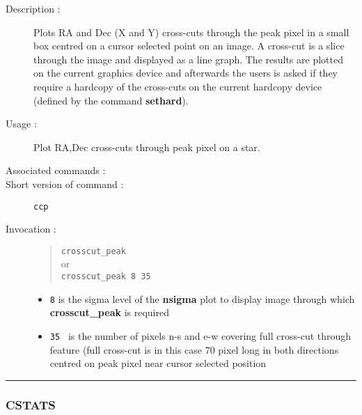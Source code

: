 \begin{description}

\item[Description :] Plots RA and Dec (X and Y) cross-cuts through the
peak pixel in a small box centred on a cursor selected point on an
image.  A cross-cut is a slice through the image and displayed as a
line graph.  The results are plotted on the current graphics device and
afterwards the users is asked if they require a hardcopy of the
cross-cuts on the current hardcopy device (defined by the command {\bf
sethard}).

\item[Usage :] Plot RA,Dec cross-cuts through peak pixel on a star.
\item[Associated commands :] {\tt {}}
\item[Short version of command :] {\tt ccp}
\item[Invocation :]

\begin{quote}{\tt  crosscut\_peak }\\
or \\
{\tt crosscut\_peak 8 35 }
\end{quote}

\begin{itemize}

\item {\tt 8} is the sigma level of the {\bf nsigma} plot to display image
through which {\bf crosscut\_peak} is required
\item {\tt 35 } is the number of pixels n-s and e-w covering full
cross-cut through feature (full cross-cut is in this case
70 pixel long in both directions centred on peak pixel
near cursor selected position
\end{itemize}\end{description}

\hrule 
\subsubsection*{\label{CSTATS}CSTATS}

